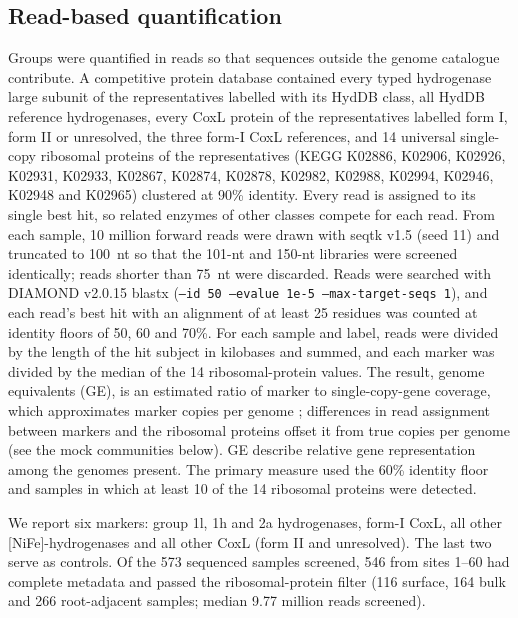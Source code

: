 \subsection*{Read-based quantification}
Groups were quantified in reads so that sequences outside the genome catalogue contribute. A competitive
protein database contained every typed hydrogenase large subunit of the representatives labelled with its
HydDB class, all HydDB reference hydrogenases, every CoxL protein of the representatives labelled form I,
form II or unresolved, the three form-I CoxL references, and 14 universal single-copy ribosomal proteins of
the representatives (KEGG K02886, K02906, K02926, K02931, K02933, K02867, K02874, K02878, K02982, K02988,
K02994, K02946, K02948 and K02965) clustered at 90\% identity. Every read is assigned to its single best
hit, so related enzymes of other classes compete for each read. From each sample, 10 million forward reads
were drawn with seqtk v1.5 \citep{li2023seqtk} (seed 11) and truncated to 100~nt so that the 101-nt and
150-nt libraries were screened identically; reads shorter than 75~nt were discarded. Reads were searched
with DIAMOND v2.0.15 \citep{buchfink2021diamond} blastx (\texttt{--id 50 --evalue 1e-5 --max-target-seqs
1}), and each read's best hit with an alignment of at least 25 residues was counted at identity floors of
50, 60 and 70\%. For each sample and label, reads were divided by the length of the hit subject in
kilobases and summed, and each marker was divided by the median of the 14 ribosomal-protein values. The
result, genome equivalents (GE), is an estimated ratio of marker to single-copy-gene coverage, which
approximates marker copies per genome \citep{nayfach2015microbecensus}; differences in read assignment
between markers and the ribosomal proteins offset it from true copies per genome (see the mock communities
below). GE describe relative gene representation among the genomes present. The primary
measure used the 60\% identity floor and samples in which at least 10 of the 14 ribosomal proteins were
detected.

We report six markers: group 1l, 1h and 2a hydrogenases, form-I CoxL, all other [NiFe]-hydrogenases and
all other CoxL (form II and unresolved). The last two serve as controls. Of the 573 sequenced samples
screened, 546 from sites 1--60 had complete metadata and passed the ribosomal-protein filter (116
surface, 164 bulk and 266 root-adjacent samples; median 9.77 million reads screened).

